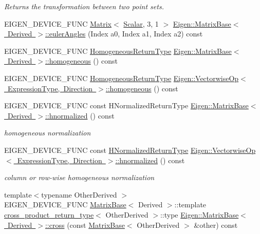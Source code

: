 \begin{DoxyCompactItemize}
\begin{DoxyCompactList}\small\item\em Returns the transformation between two point sets. \end{DoxyCompactList}\item 
E\+I\+G\+E\+N\+\_\+\+D\+E\+V\+I\+C\+E\+\_\+\+F\+U\+NC \mbox{\hyperlink{class_eigen_1_1_matrix}{Matrix}}$<$ \mbox{\hyperlink{class_eigen_1_1_dense_base_a5feed465b3a8e60c47e73ecce83e39a2}{Scalar}}, 3, 1 $>$ \mbox{\hyperlink{group___geometry___module_ga24e8dc29689f0075ba5b1f90c02b76dc}{Eigen\+::\+Matrix\+Base$<$ Derived $>$\+::euler\+Angles}} (Index a0, Index a1, Index a2) const
\item 
E\+I\+G\+E\+N\+\_\+\+D\+E\+V\+I\+C\+E\+\_\+\+F\+U\+NC \mbox{\hyperlink{class_eigen_1_1_homogeneous}{Homogeneous\+Return\+Type}} \mbox{\hyperlink{group___geometry___module_ga8cd24704519bf35e1724e1915d477a35}{Eigen\+::\+Matrix\+Base$<$ Derived $>$\+::homogeneous}} () const
\item 
E\+I\+G\+E\+N\+\_\+\+D\+E\+V\+I\+C\+E\+\_\+\+F\+U\+NC \mbox{\hyperlink{class_eigen_1_1_homogeneous}{Homogeneous\+Return\+Type}} \mbox{\hyperlink{group___geometry___module_ga7ae337c185a1de2343f12be4577c75fc}{Eigen\+::\+Vectorwise\+Op$<$ Expression\+Type, Direction $>$\+::homogeneous}} () const
\item 
E\+I\+G\+E\+N\+\_\+\+D\+E\+V\+I\+C\+E\+\_\+\+F\+U\+NC const H\+Normalized\+Return\+Type \mbox{\hyperlink{group___geometry___module_gad7e913733107a9a1b61bff95ec9c03dd}{Eigen\+::\+Matrix\+Base$<$ Derived $>$\+::hnormalized}} () const
\begin{DoxyCompactList}\small\item\em homogeneous normalization \end{DoxyCompactList}\item 
E\+I\+G\+E\+N\+\_\+\+D\+E\+V\+I\+C\+E\+\_\+\+F\+U\+NC const \mbox{\hyperlink{class_eigen_1_1_cwise_binary_op}{H\+Normalized\+Return\+Type}} \mbox{\hyperlink{group___geometry___module_ga8d3b6f7178b905b0e4418fd4900c4463}{Eigen\+::\+Vectorwise\+Op$<$ Expression\+Type, Direction $>$\+::hnormalized}} () const
\begin{DoxyCompactList}\small\item\em column or row-\/wise homogeneous normalization \end{DoxyCompactList}\item 
{\footnotesize template$<$typename Other\+Derived $>$ }\\E\+I\+G\+E\+N\+\_\+\+D\+E\+V\+I\+C\+E\+\_\+\+F\+U\+NC \mbox{\hyperlink{class_eigen_1_1_matrix_base}{Matrix\+Base}}$<$ Derived $>$\+::template \mbox{\hyperlink{struct_eigen_1_1_matrix_base_1_1cross__product__return__type}{cross\+\_\+product\+\_\+return\+\_\+type}}$<$ Other\+Derived $>$\+::type \mbox{\hyperlink{group___geometry___module_gacbaa31c2b67323d82aed4f1c1f68a1fc}{Eigen\+::\+Matrix\+Base$<$ Derived $>$\+::cross}} (const \mbox{\hyperlink{class_eigen_1_1_matrix_base}{Matrix\+Base}}$<$ Other\+Derived $>$ \&other) const

\end{DoxyCompactItemize}
